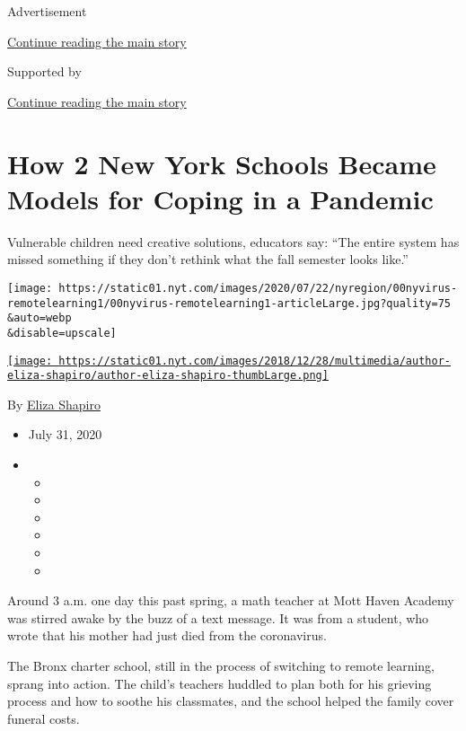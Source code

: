 Advertisement

\protect\hyperlink{after-top}{Continue reading the main story}

Supported by

\protect\hyperlink{after-sponsor}{Continue reading the main story}

\hypertarget{how-2-new-york-schools-became-models-for-coping-in-a-pandemic}{%
\section{How 2 New York Schools Became Models for Coping in a
Pandemic}\label{how-2-new-york-schools-became-models-for-coping-in-a-pandemic}}

Vulnerable children need creative solutions, educators say: ``The entire
system has missed something if they don't rethink what the fall semester
looks like.''

\texttt{[image: https://static01.nyt.com/images/2020/07/22/nyregion/00nyvirus-remotelearning1/00nyvirus-remotelearning1-articleLarge.jpg?quality=75\\\&auto=webp\\\&disable=upscale]}

\href{https://www.nytimes.com/by/eliza-shapiro}{\texttt{[image: https://static01.nyt.com/images/2018/12/28/multimedia/author-eliza-shapiro/author-eliza-shapiro-thumbLarge.png]}}

By \href{https://www.nytimes.com/by/eliza-shapiro}{Eliza Shapiro}

\begin{itemize}
\item
  July 31, 2020
\item
  \begin{itemize}
  \item
  \item
  \item
  \item
  \item
  \item
  \end{itemize}
\end{itemize}

Around 3 a.m. one day this past spring, a math teacher at Mott Haven
Academy was stirred awake by the buzz of a text message. It was from a
student, who wrote that his mother had just died from the coronavirus.

The Bronx charter school, still in the process of switching to remote
learning, sprang into action. The child's teachers huddled to plan both
for his grieving process and how to soothe his classmates, and the
school helped the family cover funeral costs.

